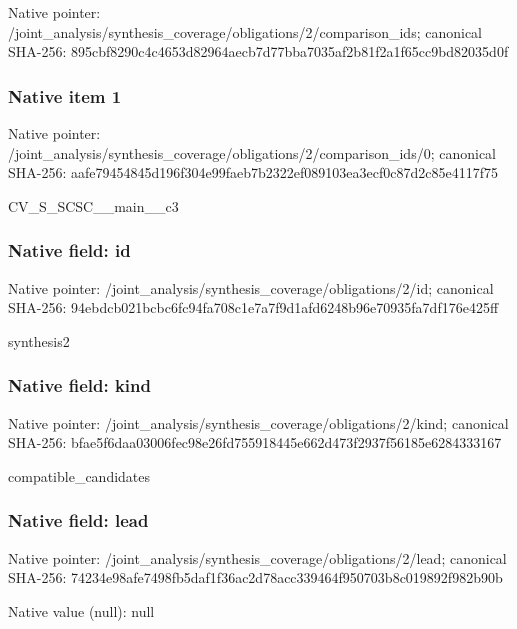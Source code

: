 \documentclass[10pt,a4paper]{article}
\begin{document}
Native pointer: /joint\_analysis/synthesi\allowbreak{}s\_coverage/obligations/2\allowbreak{}/comparison\_ids; canonical SHA-256: 895cbf8290c4c4653d82964a\allowbreak{}ecb7d77bba7035af2b81f2a1\allowbreak{}f65cc9bd82035d0f



\subsubsection{Native item 1}


Native pointer: /joint\_analysis/synthesi\allowbreak{}s\_coverage/obligations/2\allowbreak{}/comparison\_ids/0; canonical SHA-256: aafe79454845d196f304e99f\allowbreak{}aeb7b2322ef089103ea3ecf0\allowbreak{}c87d2c85e4117f75


CV\_S\_SCSC\_\_main\_\_c3


\subsubsection{Native field: id}


Native pointer: /joint\_analysis/synthesi\allowbreak{}s\_coverage/obligations/2\allowbreak{}/id; canonical SHA-256: 94ebdcb021bcbc6fc94fa708\allowbreak{}c1e7a7f9d1afd6248b96e709\allowbreak{}35fa7df176e425ff


synthesis2


\subsubsection{Native field: kind}


Native pointer: /joint\_analysis/synthesi\allowbreak{}s\_coverage/obligations/2\allowbreak{}/kind; canonical SHA-256: bfae5f6daa03006fec98e26f\allowbreak{}d755918445e662d473f2937f\allowbreak{}56185e6284333167


compatible\_candidates


\subsubsection{Native field: lead}


Native pointer: /joint\_analysis/synthesi\allowbreak{}s\_coverage/obligations/2\allowbreak{}/lead; canonical SHA-256: 74234e98afe7498fb5daf1f3\allowbreak{}6ac2d78acc339464f950703b\allowbreak{}8c019892f982b90b



Native value (null): null
\end{document}
